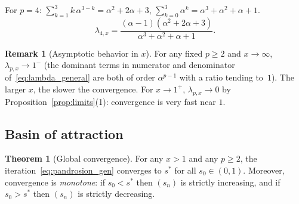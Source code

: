 \documentclass[11pt,a4paper]{article}
\theoremstyle{definition}
\newtheorem{theorem}{Theorem}[section]
\newtheorem{remark}{Remark}[section]
\begin{document}
For $p = 4$: $\sum_{k=1}^{3}k\,\alpha^{3-k} = \alpha^2 + 2\alpha + 3$, $\sum_{k=0}^{3}\alpha^k = \alpha^3+\alpha^2+\alpha+1$.
\begin{equation}
  \label{eq:lambda4}
  \lambda_{4,x} = \frac{(\alpha-1)(\alpha^2+2\alpha+3)}{\alpha^3+\alpha^2+\alpha+1}.
\end{equation}

\begin{remark}[Asymptotic behavior in $x$]
For any fixed $p \geq 2$ and $x \to \infty$, $\lambda_{p,x} \to 1^-$ (the dominant terms in numerator and denominator of~\eqref{eq:lambda_general} are both of order $\alpha^{p-1}$ with a ratio tending to~$1$). The larger $x$, the slower the convergence. For $x \to 1^+$, $\lambda_{p,x} \to 0$ by Proposition~\ref{prop:limits}(1): convergence is very fast near $1$.
\end{remark}

\subsection{Basin of attraction}

\begin{theorem}[Global convergence]
\label{thm:bassin}
For any $x > 1$ and any $p \geq 2$, the iteration~\eqref{eq:pandrosion_gen} converges to $s^*$ for all $s_0 \in (0,1)$. Moreover, convergence is \emph{monotone}: if $s_0 < s^*$ then $(s_n)$ is strictly increasing, and if $s_0 > s^*$ then $(s_n)$ is strictly decreasing.
\end{theorem}
\end{document}
